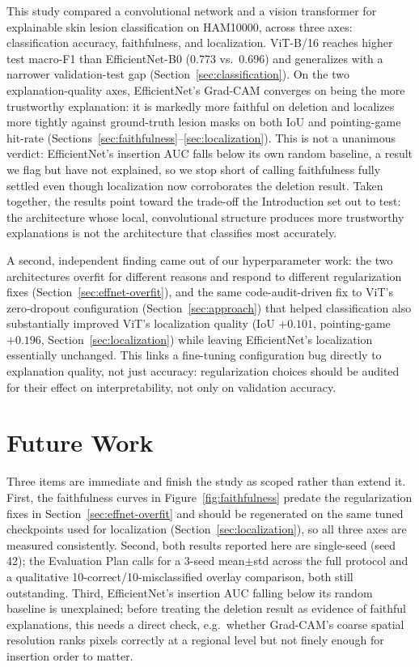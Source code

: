 \documentclass[10pt,twocolumn,letterpaper]{article}
\begin{document}
This study compared a convolutional network and a vision transformer for
explainable skin lesion classification on HAM10000, across three axes:
classification accuracy, faithfulness, and localization. ViT-B/16 reaches
higher test macro-F1 than EfficientNet-B0 (0.773 vs.\ 0.696) and generalizes
with a narrower validation-test gap (Section~\ref{sec:classification}). On
the two explanation-quality axes, EfficientNet's Grad-CAM converges on being
the more trustworthy explanation: it is markedly more faithful on deletion
and localizes more tightly against ground-truth lesion masks on both IoU and
pointing-game hit-rate (Sections~\ref{sec:faithfulness}--\ref{sec:localization}).
This is not a unanimous verdict: EfficientNet's insertion AUC falls below its
own random baseline, a result we flag but have not explained, so we stop
short of calling faithfulness fully settled even though localization now
corroborates the deletion result. Taken together, the results point toward
the trade-off the Introduction set out to test: the architecture whose
local, convolutional structure produces more trustworthy explanations is not
the architecture that classifies most accurately.

A second, independent finding came out of our hyperparameter work: the two
architectures overfit for different reasons and respond to different
regularization fixes (Section~\ref{sec:effnet-overfit}), and the same
code-audit-driven fix to ViT's zero-dropout configuration
(Section~\ref{sec:approach}) that helped classification also substantially
improved ViT's localization quality (IoU $+0.101$, pointing-game $+0.196$,
Section~\ref{sec:localization}) while leaving EfficientNet's localization
essentially unchanged. This links a fine-tuning configuration bug directly to
explanation quality, not just accuracy: regularization choices should be
audited for their effect on interpretability, not only on validation
accuracy.

\section{Future Work}
\label{sec:future-work}
Three items are immediate and finish the study as scoped rather than extend
it. First, the faithfulness curves in Figure~\ref{fig:faithfulness} predate
the regularization fixes in Section~\ref{sec:effnet-overfit} and should be
regenerated on the same tuned checkpoints used for localization
(Section~\ref{sec:localization}), so all three axes are measured
consistently. Second, both results reported here are single-seed (seed 42);
the Evaluation Plan calls for a 3-seed mean$\pm$std across the full protocol
and a qualitative 10-correct/10-misclassified overlay comparison, both still
outstanding. Third, EfficientNet's insertion AUC falling below its random
baseline is unexplained; before treating the deletion result as evidence of
faithful explanations, this needs a direct check, e.g.\ whether Grad-CAM's
coarse spatial resolution ranks pixels correctly at a regional level but not
finely enough for insertion order to matter.
\end{document}
